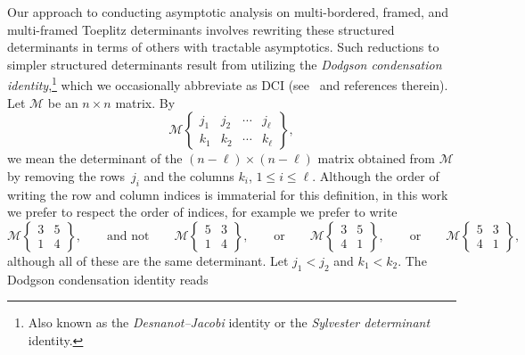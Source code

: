 \documentclass[pdftex]{sigma}
\numberwithin{equation}{section}
\begin{document}
Our approach to conducting asymptotic analysis on multi-bordered, framed, and multi-framed Toeplitz determinants involves rewriting these structured determinants in terms of others with tractable asymptotics. Such reductions to simpler structured determinants result from utilizing the \textit{Dodgson condensation identity},\footnote{Also known as the \textit{Desnanot--Jacobi} identity or the \textit{Sylvester determinant} identity.} which we occasionally abbreviate as DCI (see~\cite{Abeles,Bressoud,Fulmek-Kleber, GW} and references therein). Let $\boldsymbol{\mathscr{M}}$ be an $n \times n$ matrix. By
\[
 \mathscr{M} \left\lbrace \begin{matrix} j_1& j_2& \cdots & j_{\ell} \\ k_1& k_2& \cdots & k_{\ell} \end{matrix} \right\rbrace,
 \]
we mean the determinant of the $(n-\ell)\times(n-\ell)$ matrix obtained from $\boldsymbol{\mathscr{M}}$ by removing the rows~$j_i$ and the columns $k_i$, $1\leq i \leq \ell$. Although the order of writing the row and column indices is immaterial for this definition, in this work we prefer to respect the order of indices, for example we prefer to write \[ \mathscr{M} \left\lbrace \begin{matrix} 3& 5 \\ 1& 4 \end{matrix} \right\rbrace, \qquad \text{and not} \qquad \mathscr{M} \left\lbrace \begin{matrix} 5 & 3 \\ 1& 4 \end{matrix} \right\rbrace, \qquad \mbox{or} \qquad \mathscr{M} \left\lbrace \begin{matrix} 3& 5 \\ 4& 1 \end{matrix} \right\rbrace, \qquad \mbox{or} \qquad \mathscr{M} \left\lbrace \begin{matrix} 5 & 3 \\ 4& 1 \end{matrix} \right\rbrace, \]
although all of these are the same determinant. Let $j_1 < j_2$ and $k_1 < k_2$. The Dodgson condensation identity reads
\end{document}

